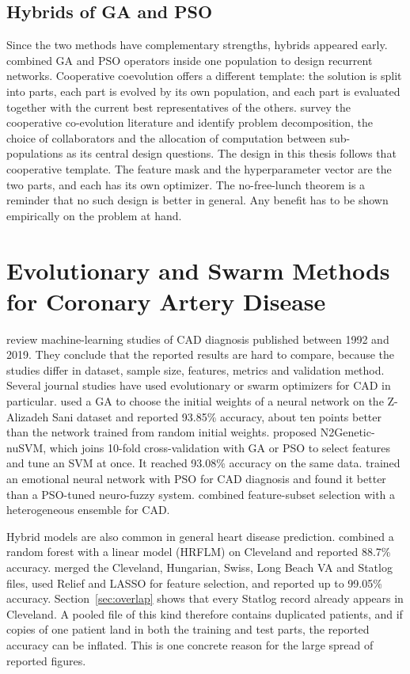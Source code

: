 \documentclass[MTech]{ugthesis}
\begin{document}
\subsection{Hybrids of GA and PSO}
Since the two methods have complementary strengths, hybrids appeared early. \citet{juang2004gapso} combined GA and PSO operators inside one population to design recurrent networks. Cooperative coevolution \citep{potter1994cc} offers a different template: the solution is split into parts, each part is evolved by its own population, and each part is evaluated together with the current best representatives of the others. \citet{ma2019ccsurvey} survey the cooperative co-evolution literature and identify problem decomposition, the choice of collaborators and the allocation of computation between sub-populations as its central design questions. The design in this thesis follows that cooperative template. The feature mask and the hyperparameter vector are the two parts, and each has its own optimizer. The no-free-lunch theorem \citep{wolpert1997nfl} is a reminder that no such design is better in general. Any benefit has to be shown empirically on the problem at hand.

\section{Evolutionary and Swarm Methods for Coronary Artery Disease}
\citet{alizadehsani2019review} review machine-learning studies of \ac{CAD} diagnosis published between 1992 and 2019. They conclude that the reported results are hard to compare, because the studies differ in dataset, sample size, features, metrics and validation method. Several journal studies have used evolutionary or swarm optimizers for CAD in particular. \citet{arabasadi2017nnga} used a GA to choose the initial weights of a neural network on the Z-Alizadeh Sani dataset and reported 93.85\% accuracy, about ten points better than the network trained from random initial weights. \citet{abdar2019n2genetic} proposed N2Genetic-nuSVM, which joins 10-fold cross-validation with GA or PSO to select features and tune an SVM at once. It reached 93.08\% accuracy on the same data. \citet{shahid2020psoemnn} trained an emotional neural network with PSO for CAD diagnosis and found it better than a PSO-tuned neuro-fuzzy system. \citet{velusamy2021ensemble} combined feature-subset selection with a heterogeneous ensemble for CAD.

Hybrid models are also common in general heart disease prediction. \citet{mohan2019hrflm} combined a random forest with a linear model (HRFLM) on Cleveland and reported 88.7\% accuracy. \citet{ghosh2021relief} merged the Cleveland, Hungarian, Swiss, Long Beach VA and Statlog files, used Relief and LASSO for feature selection, and reported up to 99.05\% accuracy. Section~\ref{sec:overlap} shows that every Statlog record already appears in Cleveland. A pooled file of this kind therefore contains duplicated patients, and if copies of one patient land in both the training and test parts, the reported accuracy can be inflated. This is one concrete reason for the large spread of reported figures.
\end{document}
